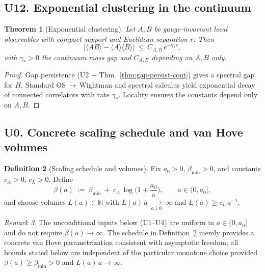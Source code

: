 \documentclass[11pt]{amsart}
\theoremstyle{plain}
\newtheorem{theorem}{Theorem}[section]
\theoremstyle{definition}
\newtheorem{definition}[theorem]{Definition}
\theoremstyle{remark}
\newtheorem{remark}[theorem]{Remark}
\begin{document}
\subsection{U12. Exponential clustering in the continuum}
\begin{theorem}[Exponential clustering]\label{thm:U12-exp-cluster}
Let $A,B$ be gauge-invariant local observables with compact support and Euclidean separation $r$. Then
\[
  \big|\langle A B\rangle - \langle A\rangle\langle B\rangle\big|\ \le\ C_{A,B}\,e^{-\gamma_* r},
\]
with $\gamma_*>0$ the continuum mass gap and $C_{A,B}$ depending on $A,B$ only.
\end{theorem}
\begin{proof}
Gap persistence (U2 + Thm.~\ref{thm:gap-persist-cont}) gives a spectral gap for $H$. Standard OS\,$\to$\,Wightman and spectral calculus yield exponential decay of connected correlators with rate $\gamma_*$. Locality ensures the constants depend only on $A,B$.
\end{proof}

\subsection{U0. Concrete scaling schedule and van Hove volumes}
\begin{definition}[Scaling schedule and volumes]\label{def:U0-schedule}
Fix $a_0>0$, $\beta_{\min}>0$, and constants $c_A>0$, $c_L>0$. Define
\[
  \beta(a)\ :=\ \beta_{\min}\ +\ c_A\,\log\Big(1+\frac{a_0}{a}\Big),\qquad a\in(0,a_0],
\]
and choose volumes $L(a)\in\mathbb N$ with $L(a)\,a\ \xrightarrow[a\downarrow 0]{}\ \infty$ and $L(a)\ge c_L\,a^{-1}$.
\end{definition}
\begin{remark}
The unconditional inputs below (U1–U4) are uniform in $a\in(0,a_0]$ and do not require $\beta(a)\to\infty$. The schedule in Definition~\ref{def:U0-schedule} merely provides a concrete van Hove parametrization consistent with asymptotic freedom; all bounds stated below are independent of the particular monotone choice provided $\beta(a)\ge \beta_{\min}>0$ and $L(a)\,a\to\infty$.
\end{remark}
\end{document}
